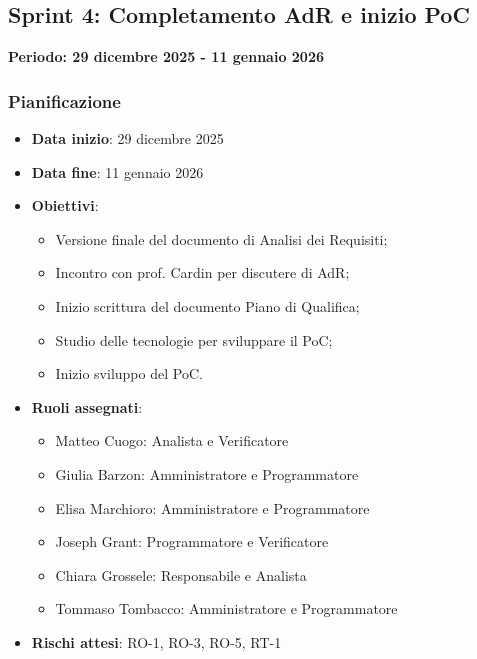 \documentclass[11pt,a4paper]{article}
\begin{document}
\subsection{Sprint 4: Completamento AdR e inizio PoC}
{\textbf{Periodo: 29 dicembre 2025 - 11 gennaio 2026}\par}

\subsubsection{Pianificazione}
\begin{itemize}
    \item \textbf{Data inizio}: 29 dicembre 2025
    \item \textbf{Data fine}: 11 gennaio 2026
    \item \textbf{Obiettivi}:
    \begin{itemize}
        \item Versione finale del documento di Analisi dei Requisiti;
        \item Incontro con prof. Cardin per discutere di AdR;
        \item Inizio scrittura del documento Piano di Qualifica;
        \item Studio delle tecnologie per sviluppare il PoC;
        \item Inizio sviluppo del PoC.
    \end{itemize}
    \item \textbf{Ruoli assegnati}:
    \begin{itemize}
        \item Matteo Cuogo: Analista e Verificatore 
        \item Giulia Barzon: Amministratore e Programmatore
        \item Elisa Marchioro: Amministratore e Programmatore
        \item Joseph Grant: Programmatore e Verificatore
        \item Chiara Grossele: Responsabile e Analista
        \item Tommaso Tombacco: Amministratore e Programmatore 
    \end{itemize}
    \item \textbf{Rischi attesi}: RO-1, RO-3, RO-5, RT-1
\end{itemize}
\end{document}
